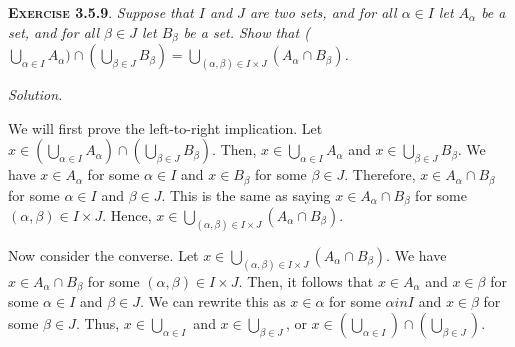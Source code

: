 \documentclass[12pt]{article}
\theoremstyle{remark}
\newenvironment{exer}[2]{
    \noindent \setlength{\parskip}{1em}%
    \textsc{\textbf{Exercise #1}}. \textit{#2} \par
    \noindent \textit{Solution.} %
}{\bigskip}
\begin{document}
\begin{exer}{3.5.9}{
    Suppose that $I$ and $J$ are two sets, and for all $\alpha \in I$ let $A_\alpha$ be a set, and for all $\beta \in J$ let $B_\beta$ be a set. Show that ($\bigcup_{\alpha \in I} A_\alpha) \cap (\bigcup_{\beta \in J} B_\beta) = \bigcup_{(\alpha, \beta) \in I \times J} (A_\alpha \cap B_\beta)$.
}
    We will first prove the left-to-right implication.
    Let $x \in (\bigcup_{\alpha \in I} A_\alpha) \cap (\bigcup_{\beta \in J} B_\beta)$.
    Then, $x \in \bigcup_{\alpha \in I} A_\alpha$ and $x \in \bigcup_{\beta \in J} B_\beta$.
    We have $x \in A_\alpha$ for some $\alpha \in I$ and $x \in B_\beta$ for some $\beta \in J$.
    Therefore, $x \in A_\alpha \cap B_\beta$ for some $\alpha \in I$ and $\beta \in J$.
    This is the same as saying $x \in A_\alpha \cap B_\beta$ for some $(\alpha, \beta) \in I \times J$.
    Hence, $x \in \bigcup_{(\alpha, \beta) \in I \times J} (A_\alpha \cap B_\beta)$.

    Now consider the converse.
    Let $x \in \bigcup_{(\alpha, \beta) \in I \times J} (A_\alpha \cap B_\beta)$.
    We have $x \in A_\alpha \cap B_\beta$ for some $(\alpha, \beta) \in I \times J$.
    Then, it follows that $x \in A_\alpha$ and $x \in \beta$ for some $\alpha \in I$ and $\beta \in J$.
    We can rewrite this as $x \in \alpha$ for some $\alpha in I$ and $x \in \beta$ for some $\beta \in J$.
    Thus, $x \in \bigcup_{\alpha \in I}$ and $x \in \bigcup_{\beta \in J}$, or $x \in (\bigcup_{\alpha \in I}) \cap (\bigcup_{\beta \in J})$.
\end{exer}
\end{document}
